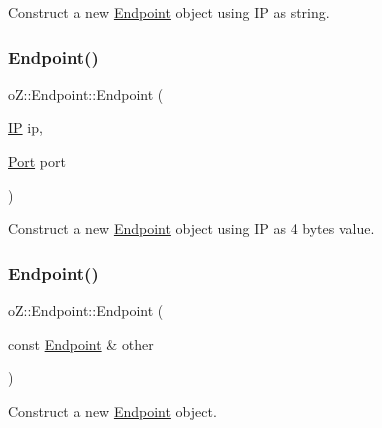 Construct a new \mbox{\hyperlink{classo_z_1_1_endpoint}{Endpoint}} object using IP as string. 

\mbox{\label{classo_z_1_1_endpoint_a7dd91554b61824eac5e0b015fa12f957}} 
\subsubsection{\texorpdfstring{Endpoint()}{Endpoint()}\hspace{0.1cm}{\footnotesize\ttfamily [3/4]}}
{\footnotesize\ttfamily o\+Z\+::\+Endpoint\+::\+Endpoint (\begin{DoxyParamCaption}\item[{\mbox{\hyperlink{namespaceo_z_ace55c2d0182a14ceea9649d0d0cf9c4a}{IP}}}]{ip,  }\item[{\mbox{\hyperlink{namespaceo_z_afeccb82d451972ba3b7d2a32b066b30b}{Port}}}]{port }\end{DoxyParamCaption})\hspace{0.3cm}{\ttfamily [inline]}}



Construct a new \mbox{\hyperlink{classo_z_1_1_endpoint}{Endpoint}} object using IP as 4 bytes value. 

\mbox{\label{classo_z_1_1_endpoint_a33f6c2eb724e0d60d988212bc6b66008}} 
\subsubsection{\texorpdfstring{Endpoint()}{Endpoint()}\hspace{0.1cm}{\footnotesize\ttfamily [4/4]}}
{\footnotesize\ttfamily o\+Z\+::\+Endpoint\+::\+Endpoint (\begin{DoxyParamCaption}\item[{const \mbox{\hyperlink{classo_z_1_1_endpoint}{Endpoint}} \&}]{other }\end{DoxyParamCaption})\hspace{0.3cm}{\ttfamily [inline]}}



Construct a new \mbox{\hyperlink{classo_z_1_1_endpoint}{Endpoint}} object. 

\mbox{\label{classo_z_1_1_endpoint_ae48da5e193017cb119233761406e7d54}} 
